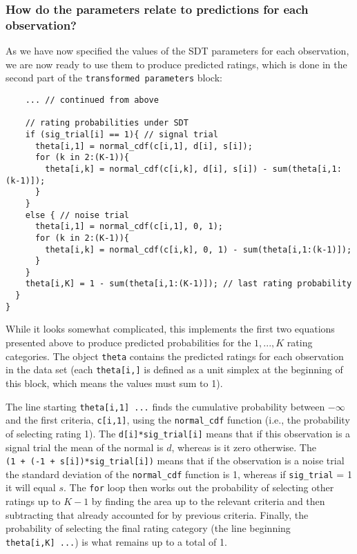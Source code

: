\documentclass[
  english,
  ,man,floatsintext]{apa6}
\begin{document}
\hypertarget{how-do-the-parameters-relate-to-predictions-for-each-observation}{%
\subsubsection{How do the parameters relate to predictions for each observation?}\label{how-do-the-parameters-relate-to-predictions-for-each-observation}}

As we have now specified the values of the SDT parameters for each observation, we are now ready to use them to produce predicted ratings, which is done in the second part of the \texttt{transformed\ parameters} block:

\begin{verbatim}
    ... // continued from above
    
    // rating probabilities under SDT
    if (sig_trial[i] == 1){ // signal trial
      theta[i,1] = normal_cdf(c[i,1], d[i], s[i]);
      for (k in 2:(K-1)){
        theta[i,k] = normal_cdf(c[i,k], d[i], s[i]) - sum(theta[i,1:(k-1)]);
      }
    }
    else { // noise trial
      theta[i,1] = normal_cdf(c[i,1], 0, 1);
      for (k in 2:(K-1)){
        theta[i,k] = normal_cdf(c[i,k], 0, 1) - sum(theta[i,1:(k-1)]);
      }
    }
    theta[i,K] = 1 - sum(theta[i,1:(K-1)]); // last rating probability 
  }
}
\end{verbatim}

While it looks somewhat complicated, this implements the first two equations presented above to produce predicted probabilities for the \(1,...,K\) rating categories. The object \texttt{theta} contains the predicted ratings for each observation in the data set (each \texttt{theta{[}i,{]}} is defined as a unit simplex at the beginning of this block, which means the values must sum to 1).

The line starting \texttt{theta{[}i,1{]}\ ...} finds the cumulative probability between \(-\infty\) and the first criteria, \texttt{c{[}i,1{]}}, using the \texttt{normal\_cdf} function (i.e., the probability of selecting rating 1). The \texttt{d{[}i{]}*sig\_trial{[}i{]}} means that if this observation is a signal trial the mean of the normal is \(d\), whereas is it zero otherwise. The \texttt{(1\ +\ (-1\ +\ s{[}i{]})*sig\_trial{[}i{]})} means that if the observation is a noise trial the standard deviation of the \texttt{normal\_cdf} function is 1, whereas if \texttt{sig\_trial} = 1 it will equal \(s\). The \texttt{for} loop then works out the probability of selecting other ratings up to \(K - 1\) by finding the area up to the relevant criteria and then subtracting that already accounted for by previous criteria. Finally, the probability of selecting the final rating category (the line beginning \texttt{theta{[}i,K{]}\ ...}) is what remains up to a total of 1.
\end{document}
